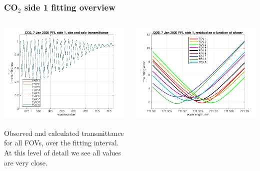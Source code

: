 \documentclass[10pt]{beamer}
\begin{document}
\begin{frame}
\frametitle{CO$_2$ side 1 fitting overview}
\begin{columns}[t]
\begin{column}{0.5\textwidth}  
  \begin{centering}
  \includegraphics[width=\textwidth]{01-07_pfl_s1_CO2/CO2_obs_and_calc.png}
  \end{centering}\vspace{3mm}

Observed and calculated transmittance for all FOVs, over the fitting
interval.  At this level of detail we see all values are very close.

\end{column}

\begin{column}{0.5\textwidth}
  \begin{centering}
  \includegraphics[width=\textwidth]{01-07_pfl_s1_CO2/CO2_wlaser_fit.png}
  \end{centering}\vspace{3mm}


\end{column}
\end{columns}
\end{frame}
\end{document}
